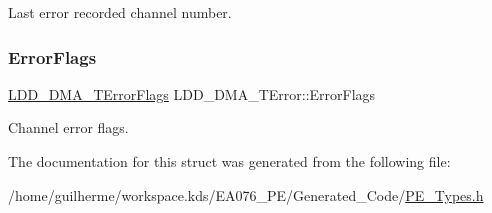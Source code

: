 Last error recorded channel number. \mbox{\label{struct_l_d_d___d_m_a___t_error_a9dd0a645e1763b4daa0058b1b29c4ad7}} 
\subsubsection{\texorpdfstring{Error\+Flags}{ErrorFlags}}
{\footnotesize\ttfamily \hyperlink{group___p_e___types__module_gaea6d9250a094d0f060ae12a0b7abb474}{L\+D\+D\+\_\+\+D\+M\+A\+\_\+\+T\+Error\+Flags} L\+D\+D\+\_\+\+D\+M\+A\+\_\+\+T\+Error\+::\+Error\+Flags}

Channel error flags. 

The documentation for this struct was generated from the following file\+:\begin{DoxyCompactItemize}
\item 
/home/guilherme/workspace.\+kds/\+E\+A076\+\_\+\+P\+E/\+Generated\+\_\+\+Code/\hyperlink{_p_e___types_8h}{P\+E\+\_\+\+Types.\+h}\end{DoxyCompactItemize}
